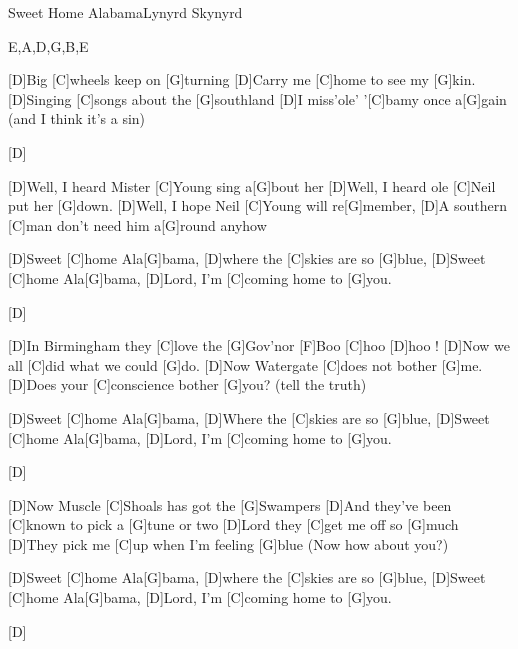 \documentclass[../main.tex]{subfiles}
\begin{document}
\begin{song}{Sweet Home Alabama}{Lynyrd Skynyrd}{}\begin{tabline}{1}{6}{8}{E,A,D,G,B,E}
		\nextbar
\end{tabline}

[D]Big [C]wheels keep on [G]turning
[D]Carry me [C]home to see my [G]kin.
[D]Singing [C]songs about the [G]southland
[D]I miss'ole' '[C]bamy once a[G]gain (and I think it's a sin)


[D] \hh[C] \hh[G] \hh[D] \hh[C] \hh[G] \hh

[D]Well, I heard Mister [C]Young sing a[G]bout her
[D]Well, I heard ole [C]Neil put her [G]down.
[D]Well, I hope Neil [C]Young will re[G]member,
[D]A southern [C]man don't need him a[G]round anyhow

[D]Sweet [C]home Ala[G]bama, [D]where the [C]skies are so [G]blue,
[D]Sweet [C]home Ala[G]bama, [D]Lord, I'm [C]coming home to [G]you.


[D] \hh[C] \hh[G] \hh[D] \hh[C] \hh[G] \hh

[D]In Birmingham they [C]love the [G]Gov'nor   [F]Boo  [C]hoo  [D]hoo !
[D]Now we all [C]did what we could [G]do.
[D]Now Watergate [C]does not bother [G]me.
[D]Does your [C]conscience bother [G]you?  (tell the truth)

[D]Sweet [C]home Ala[G]bama,
[D]Where the [C]skies are so [G]blue,
[D]Sweet [C]home Ala[G]bama,
[D]Lord, I'm [C]coming home to [G]you.


[D] \hh[C] \hh[G] \hh[D] \hh[C] \hh[G] \hh

[D]Now Muscle [C]Shoals has got the [G]Swampers
[D]And they've been [C]known to pick a [G]tune or two
[D]Lord they [C]get me off so [G]much
[D]They pick me [C]up when I'm feeling [G]blue (Now how about you?)

[D]Sweet [C]home Ala[G]bama, [D]where the [C]skies are so [G]blue,
[D]Sweet [C]home Ala[G]bama, [D]Lord, I'm [C]coming home to [G]you.


[D] \hh[C] \hh[G] \hh[D] \hh[C] \hh[G] \hh
\end{song}
\end{document}
